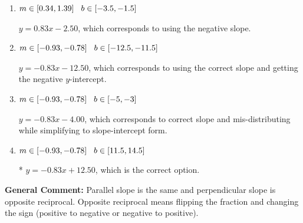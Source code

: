 \documentclass{extbook}[14pt]
\begin{document}
\begin{enumerate}
{\begin{enumerate}[label=\Alph*.]
 $y = -1.20x + 12.50$, which corresponds to using the reciprocal slope $(1/m)$.
\item \( m \in [0.34, 1.39] \hspace*{3mm} b \in [-3.5, -1.5] \)

 $y = 0.83x - 2.50$, which corresponds to using the negative slope.
\item \( m \in [-0.93, -0.78] \hspace*{3mm} b \in [-12.5, -11.5] \)

 $y = -0.83x - 12.50$, which corresponds to using the correct slope and getting the negative $y$-intercept.
\item \( m \in [-0.93, -0.78] \hspace*{3mm} b \in [-5, -3] \)

 $y = -0.83x - 4.00$, which corresponds to correct slope and mis-distributing while simplifying to slope-intercept form.
\item \( m \in [-0.93, -0.78] \hspace*{3mm} b \in [11.5, 14.5] \)

* $y = -0.83x + 12.50$, which is the correct option.
\end{enumerate}

\textbf{General Comment:} Parallel slope is the same and perpendicular slope is opposite reciprocal. Opposite reciprocal means flipping the fraction and changing the sign (positive to negative or negative to positive).
}
\end{enumerate}
\end{document}
